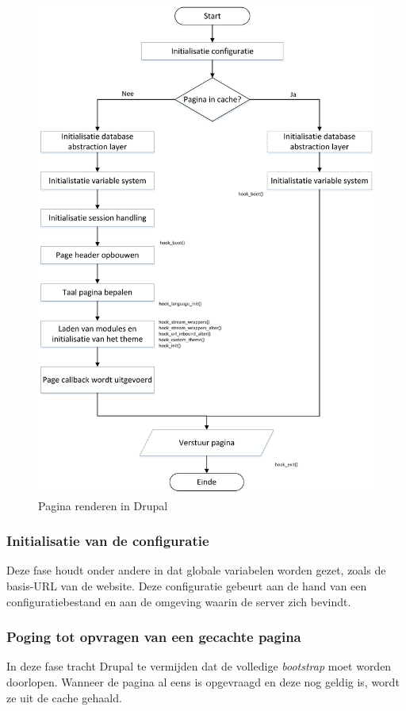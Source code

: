 \begin{figure}
\includegraphics[width=1\textwidth]{fig/drupalPageRendering}
\caption{Pagina renderen in Drupal}
\label{fig:drupalPageRendering}
\end{figure}

\subsubsection{Initialisatie van de configuratie}
Deze fase houdt onder andere in dat globale variabelen worden gezet, zoals de basis-URL van de website. Deze configuratie gebeurt aan de hand van een configuratiebestand en aan de omgeving waarin de server zich bevindt.

\subsubsection{Poging tot opvragen van een gecachte pagina}
In deze fase tracht Drupal te vermijden dat de volledige \textit{bootstrap} moet worden doorlopen. Wanneer de pagina al eens is opgevraagd en deze nog geldig is, wordt ze uit de cache gehaald.


